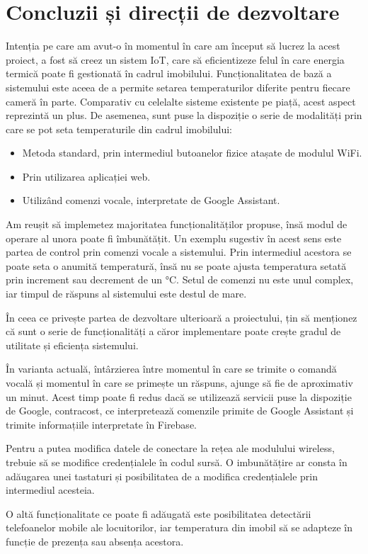 \chapter{Concluzii și direcții de dezvoltare}\label{ch:6concluzii}

	Intenția pe care am avut-o în momentul în care am început să lucrez la acest proiect, a fost să creez un sistem IoT, care să eficientizeze felul în care energia termică poate fi gestionată în cadrul imobilului. Funcționalitatea de bază a sistemului este aceea de a permite setarea temperaturilor diferite pentru fiecare cameră în parte. Comparativ cu celelalte sisteme existente pe piață, acest aspect reprezintă un plus. De asemenea, sunt puse la dispoziție o serie de modalități prin care se pot seta temperaturile din cadrul imobilului:
	\begin{itemize}
  	\setlength{\itemindent}{2em}
		\itemsep0em
		\item Metoda standard, prin intermediul butoanelor fizice atașate de modulul WiFi.
		\item Prin utilizarea aplicației web.
		\item Utilizând comenzi vocale, interpretate de Google Assistant. 
	\end{itemize} 

\vspace{1em}
	Am reușit să implemetez majoritatea funcționalităților propuse, însă modul de operare al unora poate fi îmbunătățit. Un exemplu sugestiv în acest sens este partea de control prin comenzi vocale a sistemului. Prin intermediul acestora se poate seta o anumită temperatură, însă nu se poate ajusta temperatura setată prin increment sau decrement de un °C. Setul de comenzi nu este unul complex, iar timpul de răspuns al sistemului este destul de mare. 

\vspace{1em}
	În ceea ce privește partea de dezvoltare ulterioară a proiectului, țin să menționez că sunt o serie de funcționalități a căror implementare poate crește gradul de utilitate și eficiența sistemului.

	În varianta actuală, întârzierea între momentul în care se trimite o comandă vocală și momentul în care se primește un răspuns, ajunge să fie de aproximativ un minut. Acest timp poate fi redus dacă se utilizează servicii puse la dispoziție de Google, contracost, ce interpretează comenzile primite de Google Assistant și trimite informațiile interpretate în Firebase. 

	Pentru a putea modifica datele de conectare la rețea ale modulului wireless, trebuie să se modifice credențialele în codul sursă. O imbunătățire ar consta în adăugarea unei tastaturi și posibilitatea de a modifica credențialele prin intermediul acesteia. 

	O altă funcționalitate ce poate fi adăugată este posibilitatea detectării telefoanelor mobile ale locuitorilor, iar temperatura din imobil să se adapteze în funcție de prezența sau absența acestora.
	  